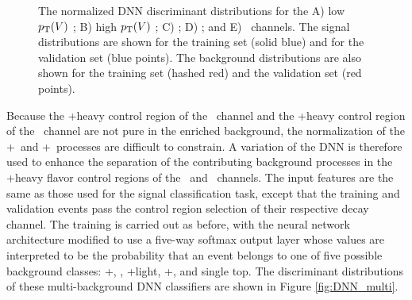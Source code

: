 \begin{figure}[htbp]
{  }
  \caption[Normalized DNN Discriminant Distributions]{The normalized DNN discriminant distributions for the A) low $p_{\mathrm{T}}(V)$ \ZllH; B) high $p_{\mathrm{T}}(V)$ \ZllH; C) \WenH; D) \WmnH; and E) \ZnnH\ channels. The signal distributions are shown for the training set (solid blue) and for the validation set (blue points). The background distributions are also shown for the training set (hashed red) and the validation set (red points).}
  \label{fig:DNN_overtrain}
\end{figure}

Because the \bosZ+heavy control region of the \ZnnH\ channel and the \bosW+heavy control region of the \WlnH\ channel are not pure in the enriched background, the normalization of the \bosV+\qrkb\ and \bosV+\qrkb\qrkbbar\ processes are difficult to constrain. A variation of the DNN is therefore used to enhance the separation of the contributing background processes in the \bosV+heavy flavor control regions of the \ZnnH\ and \WlnH\ channels. The input features are the same as those used for the signal classification task, except that the training and validation events pass the control region selection of their respective decay channel. The training is carried out as before, with the neural network architecture modified to use a five-way softmax output layer whose values are interpreted to be the probability that an event belongs to one of five possible background classes: \bosV+\qrkb\qrkbbar, \qrkt\qrktbar, \bosV+light, \bosV+\qrkb, and single top. The discriminant distributions of these multi-background DNN classifiers are shown in Figure \ref{fig:DNN_multi}.

